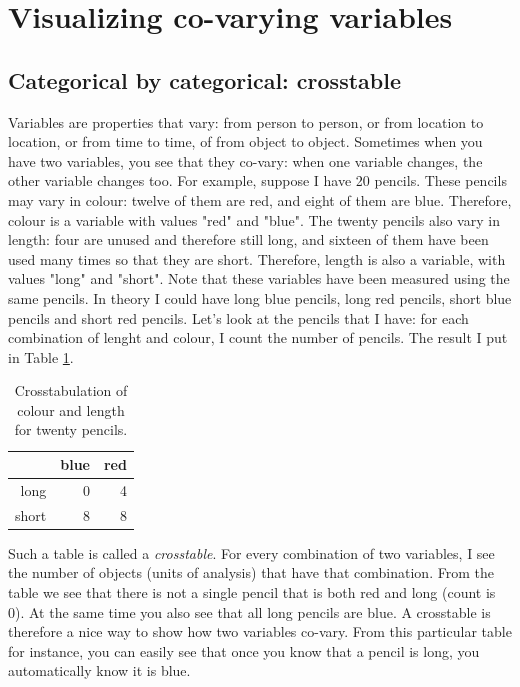 \documentclass[]{book}\usepackage[]{graphicx}\usepackage[]{color}
\begin{document}
\section{Visualizing co-varying variables}

\subsection{Categorical by categorical: crosstable}

Variables are properties that vary: from person to person, or from location to location, or from time to time, of from object to object. Sometimes when you have two variables, you see that they co-vary: when one variable changes, the other variable changes too. For example, suppose I have 20 pencils. These pencils may vary in colour: twelve of them are red, and eight of them are blue. Therefore, colour is a variable with values "red" and "blue". The twenty pencils also vary in length: four are unused and therefore still long, and sixteen of them have been used many times so that they are short. Therefore, length is also a variable, with values "long" and "short". Note that these variables have been measured using the same pencils. In theory I could have long blue pencils, long red pencils, short blue pencils and short red pencils. Let's look at the pencils that I have: for each combination of lenght and colour, I count the number of pencils. The result I put in Table \ref{tab:crosstable_1}.

\begin{table}[ht]
\centering
\caption{Crosstabulation of colour and length for twenty pencils.} 
\label{tab:crosstable_1}
\begin{tabular}{rrr}
  \hline
 & blue & red \\ 
  \hline
long & 0 & 4 \\ 
  short & 8 & 8 \\ 
   \hline
\end{tabular}
\end{table}


Such a table is called a \textit{crosstable}. For every combination of two variables, I see the number of objects (units of analysis) that have that combination. From the table we see that there is not a single pencil that is both red and long (count is 0). At the same time you also see that all long pencils are blue. A crosstable is therefore a nice way to show how two variables co-vary. From this particular table for instance, you can easily see that once you know that a pencil is long, you automatically know it is blue.
\end{document}
